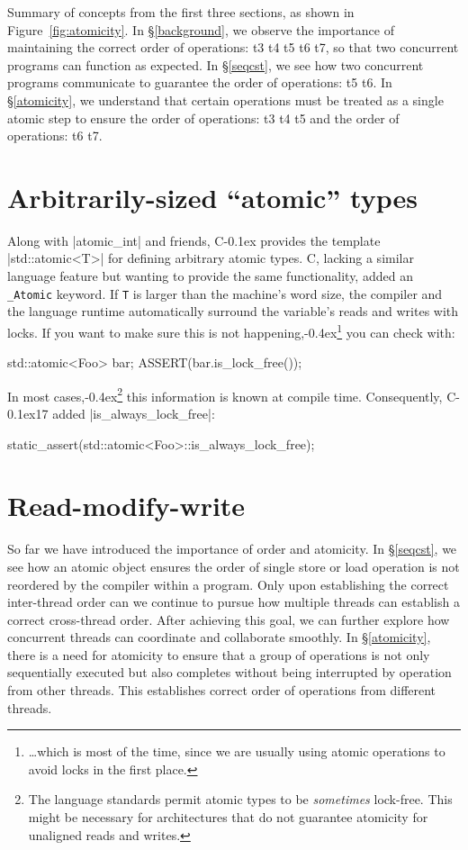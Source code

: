\documentclass[fontsize=10pt, oneside]{scrartcl}
\newcommand{\punckern}{\kern-0.4ex}
\newcommand{\monobox}[1]{\mbox{\texttt{#1}}}
\newcommand{\keyword}[1]{\monobox{\color{darkGreen}#1}}
\newcommand{\cplusplus}[1]{C\kern-0.1ex\raisebox{0.15ex}{\texttt{++}}#1}
\newcommand{\clang}[1]{C#1}
\newcommand{\fig}[1]{Figure~\ref{#1}}
\newcommand{\secref}[1]{\hyperref[#1]{\textsc{\S}\ref*{#1}}}
\begin{document}
Summary of concepts from the first three sections, as shown in \fig{fig:atomicity}.
In \secref{background}, we observe the importance of maintaining the correct order of operations: t3 \to t4 \to t5 \to t6 \to t7, so that two concurrent programs can function as expected.
In \secref{seqcst}, we see how two concurrent programs communicate to guarantee the order of operations: t5 \to t6.
In \secref{atomicity}, we understand that certain operations must be treated as a single atomic step to ensure the order of operations: t3 \to t4 \to t5 and the order of operations: t6 \to t7.

\section{Arbitrarily-sized ``atomic'' types}
\label{atomictype}
Along with \cc|atomic_int| and friends,
\cplusplus{} provides the template \cpp|std::atomic<T>| for defining arbitrary atomic types.
\clang{}, lacking a similar language feature but wanting to provide the same functionality,
added an \keyword{\_Atomic} keyword.
If \texttt{T} is larger than the machine's word size,
the compiler and the language runtime automatically surround the variable's reads and writes with locks.
If you want to make sure this is not happening,\punckern\footnote{%
\ldots which is most of the time,
since we are usually using atomic operations to avoid locks in the first place.}
you can check with:
\begin{cppcode}
std::atomic<Foo> bar;
ASSERT(bar.is_lock_free());
\end{cppcode}
In most cases,\punckern\footnote{%
The language standards permit atomic types to be \emph{sometimes} lock-free.
This might be necessary for architectures that do not guarantee atomicity for unaligned reads and writes.}
this information is known at compile time.
Consequently, \cplusplus{17} added \cpp|is_always_lock_free|:
\begin{cppcode}
static_assert(std::atomic<Foo>::is_always_lock_free);
\end{cppcode}

\section{Read-modify-write}
\label{rmw}

So far we have introduced the importance of order and atomicity.
In \secref{seqcst}, we see how an atomic object ensures the order of single store or load operation is not reordered by the compiler within a program. 
Only upon establishing the correct inter-thread order can we continue to pursue how multiple threads can establish a correct cross-thread order. 
After achieving this goal, we can further explore how concurrent threads can coordinate and collaborate smoothly.
In \secref{atomicity}, there is a need for atomicity to ensure that a group of operations is not only sequentially executed but also completes without being interrupted by operation from other threads.
This establishes correct order of operations from different threads.
\end{document}
